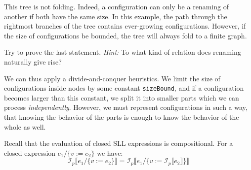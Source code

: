 This tree is not folding.
Indeed, a configuration can only be a renaming of another if both have the same size.
In this example, the path through the rightmost branches of the tree
contains ever-growing configurations.
However, if the size of configurations be bounded, the tree
will always fold to a finite graph.
\begin{exercise}
Try to prove the last statement. \textit{Hint:} To what kind of relation does
renaming naturally give rise?
\end{exercise}


We can thus apply a divide-and-conquer heuristics. 
We limit the size of configurations inside nodes by some constant \texttt{sizeBound},
and if a configuration becomes larger than this constant,
we split it into smaller parts which we can process \emph{independently}.
However, we must
represent configurations in such a way, that knowing  the behavior of the parts
is enough to know the behavior of the whole as well.

Recall that the evaluation of closed SLL expressions is compositional.
For a closed expression $e_1 / \{v := e_2\}$ we have:
\[\mathcal{I}_p\llbracket e_1 / \{v := e_2\}\rrbracket = \mathcal{I}_p \llbracket e_1 / \{v := \mathcal{I}_p\llbracket e_2\rrbracket\} \rrbracket\]



%

